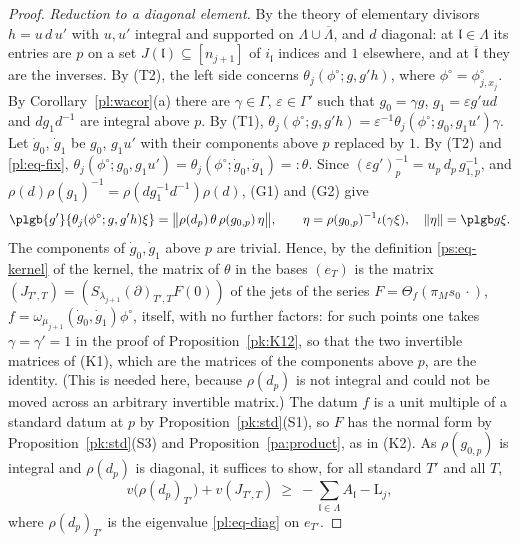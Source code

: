 \documentclass[10pt]{amsart}
\theoremstyle{definition}
\theoremstyle{remark}
\providecommand{\aubar}[1]{\overline{#1}}
\begin{document}
\begin{proof}
\emph{Reduction to a diagonal element.} By the theory of elementary divisors $h=u\,d\,u'$ with
$u,u'$ integral and supported on $\Lambda\cup\aubar\Lambda$, and $d$ diagonal: at $\mathfrak
l\in\Lambda$ its entries are $p$ on a set $J(\mathfrak l)\subseteq[n_{j+1}]$ of $i_{\mathfrak l}$
indices and $1$ elsewhere, and at $\aubar{\mathfrak l}$ they are the inverses. By (T2), the
left side concerns $\theta_j(\phi^\circ;g,g'h)$, where $\phi^\circ=\phi^\circ_{j,x_j}$. By
Corollary~\ref{pl:wacor}(a) there are $\gamma\in\Gamma$, $\varepsilon\in\Gamma'$ such that
$g_0=\gamma g$, $g_1=\varepsilon g'ud$ and $dg_1d^{-1}$ are integral above $p$. By (T1),
$\theta_j(\phi^\circ;g,g'h)=\varepsilon^{-1}\theta_j(\phi^\circ;g_0,g_1u')\gamma$. Let $\dot g_0$,
$\dot g_1$ be $g_0$, $g_1u'$ with their components above $p$ replaced by $1$. By (T2) and
\eqref{pl:eq-fix}, $\theta_j(\phi^\circ;g_0,g_1u')=\theta_j(\phi^\circ;\dot g_0,\dot g_1)=:\theta$.
Since $(\varepsilon g')_p^{-1}=u_p\,d_p\,g_{1,p}^{-1}$, and $\rho(d)\rho(g_1)^{-1}=\rho(dg_1^{-1}
d^{-1})\rho(d)$, (G1) and (G2) give
\[
\plgb{g'}{\theta_j(\phi^\circ;g,g'h)\xi}=\bigl\|\rho(d_p)\,\theta\,\rho(g_{0,p})\,\eta\bigr\|,
\qquad\eta=\rho(g_{0,p})^{-1}\iota(\gamma\xi),\quad\|\eta\|=\plgb g\xi .
\]
The components of $\dot g_0,\dot g_1$ above $p$ are trivial. Hence, by the definition
\eqref{ps:eq-kernel} of the kernel, the matrix of $\theta$ in the bases $(e_T)$ is the matrix
$(J_{T',T})=(S_{\lambda_{j+1}}(\partial)_{T',T}F(0))$ of the jets of the series $F=\Theta_f(\pi_M
s_0\,\cdot)$, $f=\omega_{\mu_{j+1}}(\dot g_0,\dot g_1)\phi^\circ$, itself, with no further factors:
for such points one takes $\gamma=\gamma'=1$ in the proof of Proposition~\ref{pk:K12}, so that the
two invertible matrices of (K1), which are the matrices of the components above $p$, are the
identity. (This is needed here, because $\rho(d_p)$ is not integral and could not be moved across an
arbitrary invertible matrix.) The datum $f$ is a unit multiple of a standard datum at $p$ by
Proposition~\ref{pk:std}(S1), so $F$ has the normal form by Proposition~\ref{pk:std}(S3) and
Proposition~\ref{pa:product}, as in (K2). As $\rho(g_{0,p})$ is integral and $\rho(d_p)$
is diagonal, it suffices to show, for all standard $T'$ and all $T$,
\begin{equation}\label{pl:eq-entry}
v\bigl(\rho(d_p)_{T'}\bigr)+v(J_{T',T})\ \ge\ -\sum_{\mathfrak l\in\Lambda}A_{\mathfrak l}-\mathrm L_j ,
\end{equation}
where $\rho(d_p)_{T'}$ is the eigenvalue \eqref{pl:eq-diag} on $e_{T'}$.


\end{proof}
\end{document}
